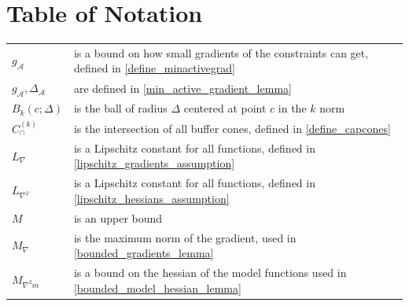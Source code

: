 \documentclass{article}
\theoremstyle{case}
\newcommand{\capcones}{{C^{(k)}_{\cap}}}
\newcommand{\lipgrad}{{L_{\nabla}}}
\newcommand{\liphess}{{L_{\nabla^2}}}
\newcommand{\maxgrad}{{M_{\nabla}}}
\newcommand{\maxmodelhessian}{{M_{\nabla^2 m}}}
\newcommand{\minactivegraddelta}{{\Delta_{\mathcal A}}}
\newcommand{\minactivegrad}{{ g_{\mathcal A} }}
\begin{document}
\section{Table of Notation}
\begin{longtable}{| p{} | p{} |}
$\minactivegrad$ & is a bound on how small gradients of the constraints can get, defined in \cref{define_minactivegrad} \\ %
$\minactivegrad, \minactivegraddelta$ & are defined in \cref{min_active_gradient_lemma} \\ %
$B_k(c; \Delta)$ & is the ball of radius $\Delta$ centered at point $c$ in the $k$ norm\\ %
$\capcones$ & is the intersection of all buffer cones, defined in \cref{define_capcones} \\ %
$\lipgrad$ & is a Lipschitz constant for all functions, defined in \cref{lipschitz_gradients_assumption} \\ %
$\liphess$ & is a Lipschitz constant for all functions, defined in \cref{lipschitz_hessians_assumption} \\ %
$M$ & is an upper bound \\ %
$\maxgrad$ & is the maximum norm of the gradient, used in \cref{bounded_gradients_lemma} \\ %
$\maxmodelhessian$ & is a bound on the hessian of the model functions used in \cref{bounded_model_hessian_lemma} \\ %

\end{longtable}
\end{document}
